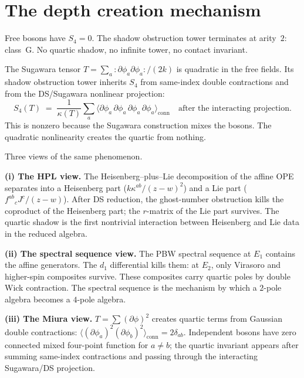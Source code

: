 \documentclass[11pt]{article}
\newcommand{\normord}[1]{:\!#1\!:}
\begin{document}
\section{The depth creation mechanism}
\label{sec:depth-creation}

Free bosons have $S_4 = 0$.  The shadow obstruction tower terminates at
arity~$2$: class~G.  No quartic shadow, no infinite tower, no
contact invariant.

The Sugawara tensor $T = \sum_a \normord{\partial\phi_a
\partial\phi_a}/(2k)$ is quadratic in the free fields.  Its
shadow obstruction tower inherits $S_4$ from same-index double
contractions and from the DS/Sugawara nonlinear projection:
\[
S_4(T) \;=\; \frac{1}{\kappa(T)}
\sum_a \langle \partial\phi_a\, \partial\phi_a\,
\partial\phi_a\, \partial\phi_a \rangle_{\mathrm{conn}}
\quad\text{after the interacting projection.}
\]
This is nonzero because the Sugawara construction mixes the
bosons.  The quadratic nonlinearity creates the quartic from
nothing.

Three views of the same phenomenon.

\medskip
\noindent\textbf{(i) The HPL view.}\enspace
The Heisenberg--plus--Lie decomposition of the affine OPE
separates into a Heisenberg part ($k\kappa^{ab}/(z-w)^2$)
and a Lie part ($f^{ab}{}_c J^c/(z-w)$).  After DS reduction,
the ghost-number obstruction kills the coproduct of the
Heisenberg part; the $r$-matrix of the Lie part survives.  The
quartic shadow is the first nontrivial interaction between
Heisenberg and Lie data in the reduced algebra.

\medskip
\noindent\textbf{(ii) The spectral sequence view.}\enspace
The PBW spectral sequence at $E_1$ contains the affine
generators.  The $d_1$ differential kills them: at $E_2$, only
Virasoro and higher-spin composites survive.  These composites
carry quartic poles by double Wick contraction.  The spectral
sequence is the mechanism by which a $2$-pole algebra becomes
a $4$-pole algebra.

\medskip
\noindent\textbf{(iii) The Miura view.}\enspace
$T = \sum (\partial\phi)^2$ creates quartic terms from Gaussian
double contractions:
$\langle(\partial\phi_a)^2(\partial\phi_b)^2\rangle_{\mathrm{conn}}
=2\delta_{ab}$.  Independent bosons have zero connected mixed
four-point function for $a\neq b$; the quartic invariant appears
after summing same-index contractions and passing through the
interacting Sugawara/DS projection.
\end{document}
